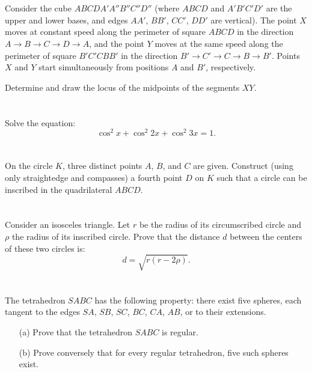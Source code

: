 \documentclass[12pt,a4paper]{article}
\begin{document}
\section{}
Consider the cube $ABCDA'A''B''C''D''$ (where $ABCD$ and $A'B'C'D'$ are the upper and lower bases, and edges $AA'$, $BB'$, $CC'$, $DD'$ are vertical).  
The point $X$ moves at constant speed along the perimeter of square $ABCD$ in the direction $A \rightarrow B \rightarrow C \rightarrow D \rightarrow A$,  
and the point $Y$ moves at the same speed along the perimeter of square $B'C'CBB'$ in the direction $B' \rightarrow C' \rightarrow C \rightarrow B \rightarrow B'$.  
Points $X$ and $Y$ start simultaneously from positions $A$ and $B'$, respectively.

Determine and draw the locus of the midpoints of the segments $XY$.

\section{}
Solve the equation:
\[
\cos^2 x + \cos^2 2x + \cos^2 3x = 1.
\]

\section{}
On the circle $K$, three distinct points $A$, $B$, and $C$ are given.  
Construct (using only straightedge and compasses) a fourth point $D$ on $K$ such that a circle can be inscribed in the quadrilateral $ABCD$.

\section{}
Consider an isosceles triangle. Let $r$ be the radius of its circumscribed circle and $\rho$ the radius of its inscribed circle.  
Prove that the distance $d$ between the centers of these two circles is:
\[
d = \sqrt{r(r - 2\rho)}.
\]

\section{}
The tetrahedron $SABC$ has the following property:  
there exist five spheres, each tangent to the edges $SA$, $SB$, $SC$, $BC$, $CA$, $AB$, or to their extensions.

\begin{itemize}
    \item[(a)] Prove that the tetrahedron $SABC$ is regular.
    \item[(b)] Prove conversely that for every regular tetrahedron, five such spheres exist.
\end{itemize}
\end{document}
